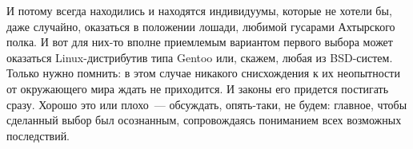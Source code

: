 И потому всегда находились и находятся индивидуумы, которые не хотели бы, даже случайно, оказаться в положении лошади, любимой гусарами Ахтырского полка. И вот для них-то вполне приемлемым вариантом первого выбора может оказаться Linux-дистрибутив типа Gentoo или, скажем, любая из BSD-систем. Только нужно помнить: в этом случае никакого снисхождения к их неопытности от окружающего мира ждать не приходится. И законы его придется постигать сразу. Хорошо это или плохо~--- обсуждать, опять-таки, не будем: главное, чтобы сделанный выбор был осознанным, сопровождаясь пониманием всех возможных последствий.